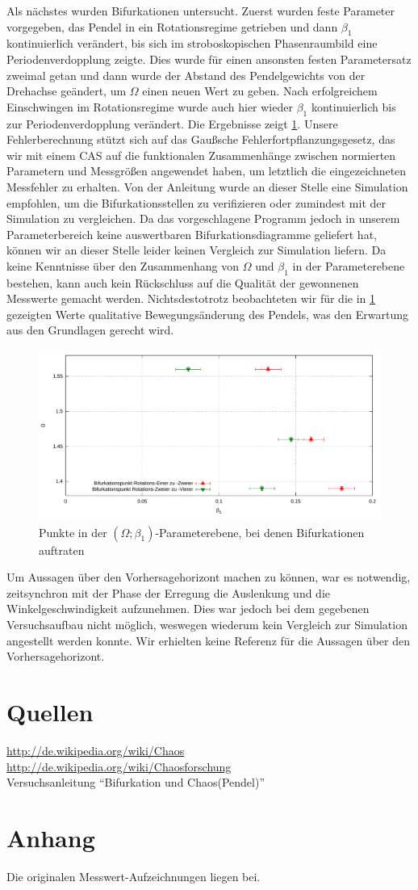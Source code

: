 \documentclass[numbers=noenddot,12pt,a4paper]{scrartcl}
\newcommand{\ix}[1]{_\text{#1}}
\begin{document}
Als nächstes wurden Bifurkationen untersucht. Zuerst wurden feste Parameter vorgegeben, das Pendel in ein Rotationsregime getrieben und dann $\beta\ix{1}$ kontinuierlich verändert, bis sich im stroboskopischen Phasenraumbild eine Periodenverdopplung zeigte. Dies wurde für einen ansonsten festen Parametersatz zweimal getan und dann wurde der Abstand des Pendelgewichts von der Drehachse geändert, um $\Omega$ einen neuen Wert zu geben. Nach erfolgreichem Einschwingen im Rotationsregime wurde auch hier wieder $\beta\ix{1}$ kontinuierlich bis zur Periodenverdopplung verändert. Die Ergebnisse zeigt \ref{img:beef}. Unsere Fehlerberechnung stützt sich auf das Gaußsche Fehlerfortpflanzungsgesetz, das wir mit einem CAS auf die funktionalen Zusammenhänge zwischen normierten Parametern und Messgrößen angewendet haben, um letztlich die eingezeichneten Messfehler zu erhalten. Von der Anleitung wurde an dieser Stelle eine Simulation empfohlen, um die Bifurkationsstellen zu verifizieren oder zumindest mit der Simulation zu vergleichen. Da das vorgeschlagene Programm jedoch in unserem Parameterbereich keine auswertbaren Bifurkationsdiagramme geliefert hat, können wir an dieser Stelle leider keinen Vergleich zur Simulation liefern. Da keine Kenntnisse über den Zusammenhang von $\Omega$ und $\beta\ix{1}$ in der Parameterebene bestehen, kann auch kein Rückschluss auf die Qualität der gewonnenen Messwerte gemacht werden. Nichtsdestotrotz beobachteten  wir für die in \ref{img:beef} gezeigten Werte qualitative Bewegungsänderung des Pendels, was den Erwartung aus den Grundlagen gerecht wird.
\begin{figure}[H]
	\includegraphics[width=\textwidth]{messwerte/beefurkation.pdf}
	\caption{Punkte in der $(\Omega;\beta\ix{1})$-Parameterebene, bei denen Bifurkationen auftraten}
	\label{img:beef}
\end{figure}
Um Aussagen über den Vorhersagehorizont machen zu können, war es notwendig, zeitsynchron mit der Phase der Erregung die Auslenkung und die Winkelgeschwindigkeit aufzunehmen. Dies war jedoch bei dem gegebenen Versuchsaufbau nicht möglich, weswegen wiederum kein Vergleich zur Simulation angestellt werden konnte. Wir erhielten keine Referenz für die Aussagen über den Vorhersagehorizont.
\section{Quellen}
\url{http://de.wikipedia.org/wiki/Chaos}\\
\url{http://de.wikipedia.org/wiki/Chaosforschung}\\
Versuchsanleitung "`Bifurkation und Chaos(Pendel)"'
\section{Anhang}
Die originalen Messwert-Aufzeichnungen liegen bei.
\end{document}

